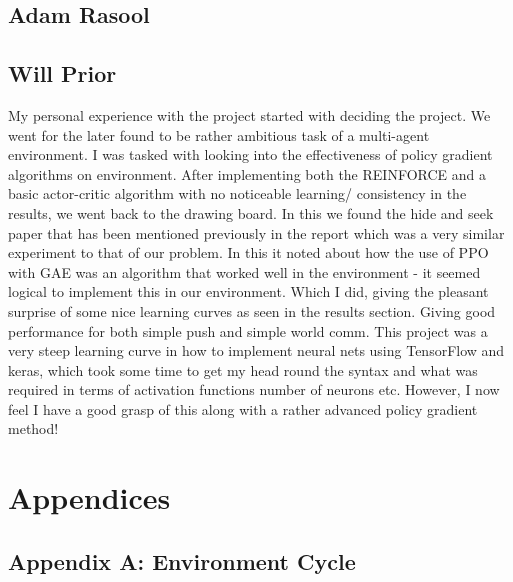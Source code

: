 \documentclass{article}
\begin{document}
\subsection{Adam Rasool}

\subsection{Will Prior}

My personal experience with the project started with deciding the project.
We went for the later found to be rather ambitious task of a multi-agent environment.
I was tasked with looking into the effectiveness of policy gradient algorithms on environment.
After implementing both the REINFORCE and a basic actor-critic algorithm with no noticeable learning/ consistency in the results, we went back to the drawing board.
In this we found the hide and seek paper that has been mentioned previously in the report which was a very similar experiment to that of our problem.
In this it noted about how the use of PPO with GAE was an algorithm that worked well in the environment - it seemed logical to implement this in our environment.
Which I did, giving the pleasant surprise of some nice learning curves as seen in the results section.
Giving good performance for both simple push and simple world comm.
This project was a very steep learning curve in how to implement neural nets using TensorFlow and keras, which took some time to get my head round the syntax and what was required in terms of activation functions number of neurons etc.
However, I now feel I have a good grasp of this along with a rather advanced policy gradient method!




\small

\normalsize
\newpage
\section*{Appendices}
\subsection*{Appendix A: Environment Cycle}
\end{document}
